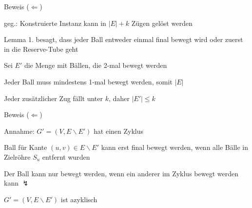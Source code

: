 \documentclass{beamer}
\begin{document}
\begin{frame}{Beweis (\glqq $\Leftarrow$\grqq)}
\begin{pointlist}
\item geg.: Konstruierte Instanz kann in $|E|+k$ Zügen gelöst werden
\item Lemma 1. besagt, dass jeder Ball entweder einmal final bewegt wird oder zuerst in die Reserve-Tube geht
\item Sei $E'$ die Menge mit Bällen, die 2-mal bewegt werden
\item Jeder Ball muss mindestens 1-mal bewegt werden, somit $|E|$
\item Jeder zusätzlicher Zug fällt unter $k$, daher $|E'|\leq k$
\end{pointlist}
\end{frame}

\begin{frame}{Beweis (\glqq $\Leftarrow$\grqq)}
\begin{pointlist}
\item Annahme: $G'=(V,E\backslash E')$ hat einen Zyklus
\item Ball für Kante $(u,v)\in E\backslash E'$ kann erst final bewegt werden, wenn alle Bälle in Zielröhre $S_u$ entfernt wurden
\item Der Ball kann nur bewegt werden, wenn ein anderer im Zyklus bewegt werden kann $\lightning$ 
\begin{arrowlist}
\item $G'=(V,E\backslash E')$ ist azyklisch 
\end{arrowlist}
\end{pointlist}
\begin{figure}
    \centering
    \qquad
\end{figure}
\end{frame}
\end{document}
